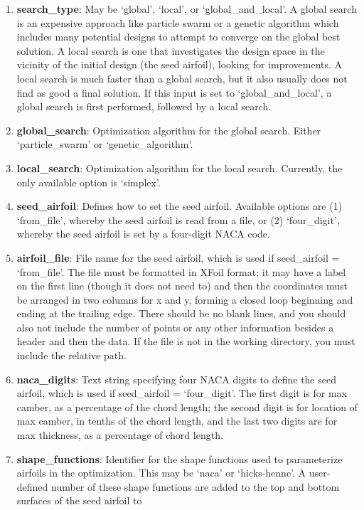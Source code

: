 \documentclass[11pt]{article}
\begin{document}
\begin{enumerate}
\item{\textbf{search\_type}: May be `global', `local', or `global\_and\_local'.
A global search is an expensive approach like particle swarm or a genetic algorithm which
includes many potential designs to attempt to converge on the global best solution.  A
local search is one that investigates the design space in the vicinity of the initial
design (the seed airfoil), looking for improvements.  A local search is much faster than
a global search, but it also usually does not find as good a final solution.  If this
input is set to `global\_and\_local', a global search is first performed, followed by a
local search.}
\item{\textbf{global\_search}: Optimization algorithm for the global search.  Either
`particle\_swarm' or `genetic\_algorithm'.}
\item{\textbf{local\_search}: Optimization algorithm for the local search.  Currently, the
only available option is `simplex'.}
\item{\textbf{seed\_airfoil}: Defines how to set the seed airfoil.  Available options are
(1) `from\_file', whereby the seed airfoil is read from a file, or (2) `four\_digit',
whereby the seed airfoil is set by a four-digit NACA code.}
\item{\textbf{airfoil\_file}: File name for the seed airfoil, which is used if
seed\_airfoil = `from\_file'.  The file must be formatted in XFoil format; it may have a
label on the first line (though it does not need to) and then the coordinates must be
arranged in two columns for x and y, forming a closed loop beginning and ending at the
trailing edge. There should be no blank lines, and you should also not include the number
of points or any other information besides a header and then the data.  If the file is not 
in the working directory, you must include the relative path.}
\item{\textbf{naca\_digits}: Text string specifying four NACA digits to define the seed
airfoil, which is used if seed\_airfoil = `four\_digit'.  The first digit is for max camber,
as a percentage of the chord length; the second digit is for location of max camber, in
tenths of the chord length, and the last two digits are for max thickness, as a percentage
of chord length.}
\item{\textbf{shape\_functions}: Identifier for the shape functions used to parameterize
airfoils in the optimization.  This may be `naca' or `hicks-henne'.  A user-defined number
of these shape functions are added to the top and bottom surfaces of the seed airfoil to
}
\end{enumerate}
\end{document}
